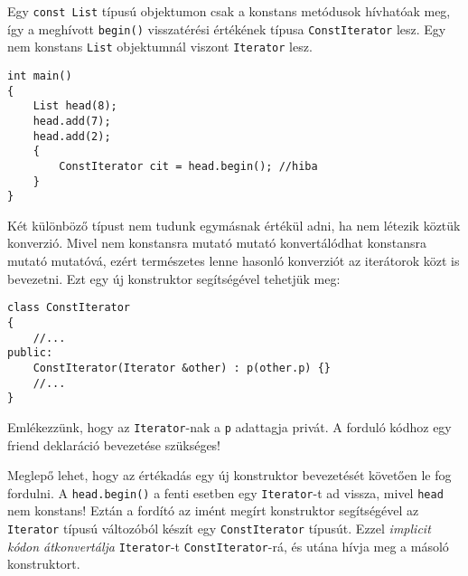 \documentclass[a4paper,11.5pt,table]{article}
\begin{document}
	Egy \texttt{const List} típusú objektumon csak a konstans metódusok hívhatóak meg, így a meghívott \texttt{begin()} visszatérési értékének típusa \texttt{ConstIterator} lesz. Egy nem konstans \texttt{List} objektumnál viszont \texttt{Iterator} lesz.
	\begin{lstlisting}
int main()
{
	List head(8);
	head.add(7);
	head.add(2);
	{
		ConstIterator cit = head.begin(); //hiba
	}
}
	\end{lstlisting}
	Két különböző típust nem tudunk egymásnak értékül adni, ha nem létezik köztük konverzió. Mivel nem konstansra mutató mutató konvertálódhat konstansra mutató mutatóvá, ezért természetes lenne hasonló konverziót az iterátorok közt is bevezetni. Ezt egy új konstruktor segítségével tehetjük meg:
	\begin{lstlisting}
class ConstIterator
{
	//...
public:
	ConstIterator(Iterator &other) : p(other.p) {}
	//...
}
	\end{lstlisting}
	Emlékezzünk, hogy az \texttt{Iterator}-nak a \texttt{p} adattagja privát. A forduló kódhoz egy friend deklaráció bevezetése szükséges!
	
	Meglepő lehet, hogy az értékadás egy új konstruktor bevezetését követően le fog fordulni. A \texttt{head.begin()} a fenti esetben egy \texttt{Iterator}-t ad vissza, mivel \texttt{head} nem konstans! Eztán a fordító az imént megírt konstruktor segítségével az \texttt{Iterator} típusú változóból készít egy \texttt{ConstIterator} típusút. Ezzel \textit{implicit kódon átkonvertálja} \texttt{Iterator}-t \texttt{ConstIterator}-rá, és utána hívja meg a másoló konstruktort. 
	
\end{document}
